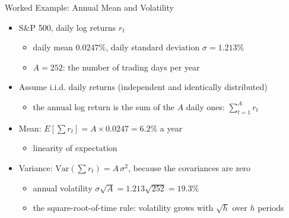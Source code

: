 \begin{frame}{Worked Example: Annual Mean and Volatility}
\itemsize{\small}
\begin{itemize}
    \item S\&P 500, daily log returns $r_t$
    \begin{itemize}
        \item daily mean $0.0247\%$, daily standard deviation $\sigma = 1.213\%$
        \item $A = 252$: the number of trading days per year
    \end{itemize}
    \item Assume i.i.d. daily returns (independent and identically distributed)
    \begin{itemize}
        \item the annual log return is the sum of the $A$ daily ones: $\sum_{t=1}^{A} r_t$
    \end{itemize}
    \item Mean: $E[\sum r_t] = A \times 0.0247 = 6.2\%$ a year
    \begin{itemize}
        \item linearity of expectation
    \end{itemize}
    \item Variance: $\text{Var}(\sum r_t) = A\,\sigma^2$, because the covariances are zero
    \begin{itemize}
        \item annual volatility $\sigma\sqrt{A} = 1.213\sqrt{252} = 19.3\%$
        \item the square-root-of-time rule: volatility grows with $\sqrt{h}$ over $h$ periods
    \end{itemize}
\end{itemize}
\end{frame}

